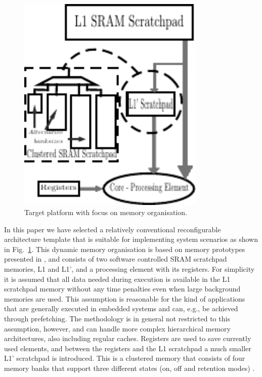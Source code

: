 \begin{figure}[!t]
\centering
\includegraphics[width=0.8\textwidth]{A/platform_v10-eps-converted-to.pdf}
\caption{Target platform with focus on memory organisation.}
\label{fig:platformA}
\end{figure}

In this paper we have selected a relatively conventional reconfigurable architecture template that is suitable for implementing system scenarios as shown in Fig.~\ref{fig:platformA}. This dynamic memory organisation is based on memory prototypes presented in \cite{Artes2011}, and consists of two software controlled SRAM scratchpad memories, L1 and L1', and a processing element with its registers. For simplicity it is assumed that all data needed during execution is available in the L1 scratchpad memory without any time penalties even when large background memories are used. This assumption is reasonable for the kind of applications that are generally executed in embedded systems and can, e.g., be achieved through prefetching. The methodology is in general not restricted to this assumption, however, and can handle more complex hierarchical memory architectures, also including regular caches. Registers are used to save currently used elements, and between the registers and the L1 scratchpad a much smaller L1' scratchpad is introduced. This is a clustered memory that consists of four memory banks that support three different states (on, off and retention modes) \cite{Artes2011}. 

